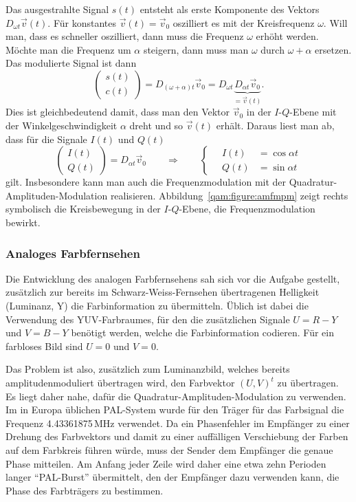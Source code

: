Das ausgestrahlte Signal $s(t)$ entsteht als erste Komponente
des Vektors $D_{\omega t}\vec{v}(t)$.
Für konstantes $\vec{v}(t)=\vec{v}_0$ oszilliert es mit der Kreisfrequenz
$\omega$.
Will man, dass es schneller oszilliert, dann muss die Frequenz $\omega$
erhöht werden.
Möchte man die Frequenz um $\alpha$ steigern, dann muss man $\omega$
durch $\omega+\alpha$ ersetzen.
Das modulierte Signal ist dann
\[
\begin{pmatrix}
s(t)\\c(t)
\end{pmatrix}
=
D_{(\omega+\alpha)t} \vec{v}_0
=
D_{\omega t} \underbrace{D_{\alpha t} \vec{v}_0}_{\displaystyle=\vec{v}(t)}.
\]
Dies ist gleichbedeutend damit, dass man den Vektor $\vec{v}_0$ in der
$I$-$Q$-Ebene mit der Winkelgeschwindigkeit $\alpha$ dreht und so
$\vec{v}(t)$ erhält.
Daraus liest man ab, dass für die Signale $I(t)$ und $Q(t)$
\begin{equation}
\begin{pmatrix}I(t)\\Q(t)\end{pmatrix}
=
D_{\alpha t}\vec{v}_0
\qquad\Rightarrow\qquad
\left\{
\quad
\begin{aligned}
I(t)&=\cos\alpha t\\
Q(t)&=\sin\alpha t
\end{aligned}
\right.
\end{equation}
gilt.
Insbesondere kann man auch die Frequenzmodulation mit der
Quadratur-Amplituden-Modulation realisieren.
Abbildung~\ref{qam:figure:amfmpm} zeigt rechts symbolisch die
Kreisbewegung in der $I$-$Q$-Ebene, die Frequenzmodulation bewirkt.

\subsubsection{Analoges Farbfernsehen}
Die Entwicklung des analogen Farbfernsehens sah sich vor die Aufgabe 
gestellt, zusätzlich zur bereits im Schwarz-Weiss-Fernsehen übertragenen
Helligkeit (Luminanz, Y) die Farbinformation zu übermitteln.
Üblich ist dabei die Verwendung des YUV-Farbraumes, für den die zusätzlichen
Signale $U=R-Y$ und $V=B-Y$ benötigt werden, welche die Farbinformation
codieren.
Für ein farbloses Bild sind $U=0$ und $V=0$.

Das Problem ist also, zusätzlich zum Luminanzbild, welches bereits
amplitudenmoduliert übertragen wird, den Farbvektor $(U,V)^t$ zu
übertragen.
Es liegt daher nahe, dafür die Quadratur-Amplituden-Modulation zu
verwenden.
Im in Europa üblichen PAL-System wurde für den Träger für das Farbsignal
die Frequenz 4.43361875\,MHz verwendet.
Da ein Phasenfehler im Empfänger zu einer Drehung des Farbvektors
und damit zu einer auffälligen Verschiebung der Farben auf dem Farbkreis
führen würde, muss der Sender dem Empfänger die genaue Phase mitteilen.
Am Anfang jeder Zeile wird daher eine etwa zehn Perioden langer ``PAL-Burst''
übermittelt, den der Empfänger dazu verwenden kann, die Phase des
Farbträgers zu bestimmen.

